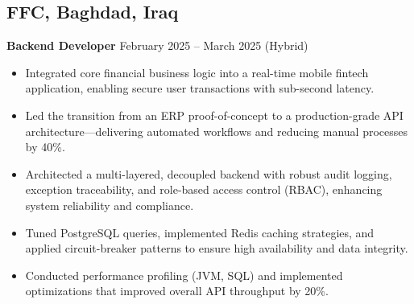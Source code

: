 \documentclass[11pt]{article}
\begin{document}
\subsection*{FFC, Baghdad, Iraq}
\textbf{Backend Developer} \hfill February 2025 -- March 2025 (Hybrid)\\
\begin{itemize}\itemsep0pt
  \item Integrated core financial business logic into a real-time mobile fintech application, enabling secure user transactions with sub-second latency.
  \item Led the transition from an ERP proof-of-concept to a production-grade API architecture—delivering automated workflows and reducing manual processes by 40\%.
  \item Architected a multi-layered, decoupled backend with robust audit logging, exception traceability, and role-based access control (RBAC), enhancing system reliability and compliance.
  \item Tuned PostgreSQL queries, implemented Redis caching strategies, and applied circuit-breaker patterns to ensure high availability and data integrity.
  \item Conducted performance profiling (JVM, SQL) and implemented optimizations that improved overall API throughput by 20\%.
\end{itemize}
\end{document}
